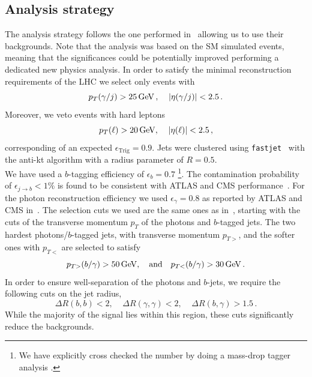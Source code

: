 \subsection{Analysis strategy \label{sec:analysisstrategy}}
The analysis strategy follows the one performed in~\cite{Azatov:2015oxa} allowing us to use their backgrounds. Note that the analysis was based on the SM  simulated events, meaning that the significances could be potentially improved performing a dedicated new physics analysis.
In order to satisfy the minimal reconstruction requirements of the LHC we select only events with
\begin{equation}
	p_T(\gamma/j) > 25 \, \GeV\,, \; \; \; \; |\eta(\gamma/j)| < 2.5\,.
\end{equation}
Moreover, we veto events with hard leptons
\begin{equation}
	p_T(\ell) > 20 \, \GeV, \; \; \; \; |\eta(\ell)| < 2.5\,,
\end{equation}
corresponding of an expected $ \epsilon_{\mathrm{Trig}}=0.9$.
Jets were clustered using \texttt{fastjet}~\cite{Cacciari:2011ma}  with the anti-kt algorithm with a radius parameter of $R=0.5$. \\
We have used a $b$-tagging efficiency of $ \epsilon_b = 0.7$ \footnote{We have explicitly cross checked the number by doing a mass-drop tagger analysis \cite{Butterworth:2008iy}.}.
The contamination probability of $\epsilon_{j \to b} < 1 \%$  is found to be consistent with ATLAS and CMS performance~\cite{Chatrchyan:2012dk,CMS:2013vea,ATL-PHYS-PUB-2013-009}. For the photon reconstruction efficiency  we used $ \epsilon_\gamma = 0.8$ as reported by ATLAS and CMS in~\cite{ATL-PHYS-PUB-2013-009,CMS:2013aoa}.
The selection cuts we used are the same ones as in~\cite{Azatov:2015oxa}, starting with the cuts of the transverse momentum $p_T$ of the photons and $b$-tagged jets. The two hardest photons/$b$-tagged jets,  with transverse momentum $p_{T>}$, and the softer ones with $p_{T<}$ are selected to satisfy
\begin{equation}
	p_{T>}(b/ \gamma) > 50 \, \GeV, \quad \text{and} \quad   p_{T<}(b/ \gamma) > 30 \, \GeV\,.
	\label{cut1}
\end{equation}
%
In order to ensure well-separation of the photons and $b$-jets, we require the following cuts on the jet radius,
\begin{equation}
	\Delta R(b,b) < 2  ,\; \; \; \; \Delta R(\gamma,\gamma) < 2, \; \;  \; \; \Delta R(b,\gamma) > 1.5\,.
	\label{cut2}
\end{equation}
While the majority of the signal lies within this region, these cuts significantly reduce the backgrounds.

